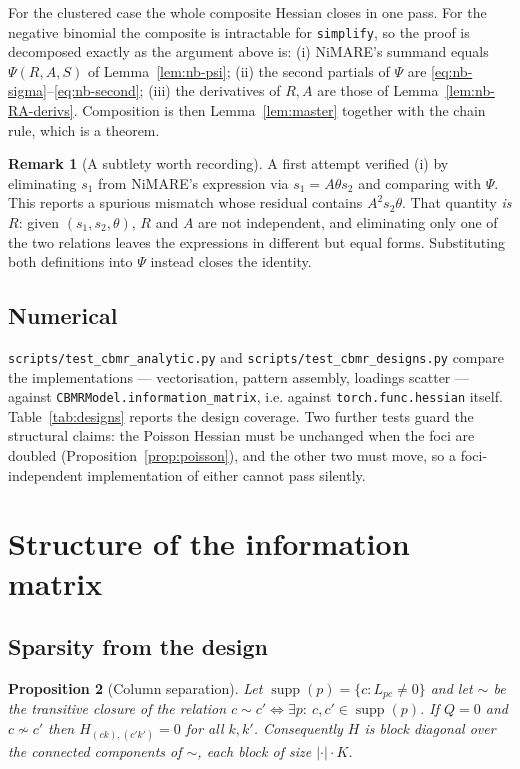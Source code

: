 \documentclass[11pt,a4paper]{article}
\theoremstyle{plain}
\newtheorem{proposition}{Proposition}
\theoremstyle{definition}
\newtheorem{remark}[proposition]{Remark}
\newcommand{\supp}{\operatorname{supp}}
\begin{document}
For the clustered case the whole composite Hessian closes in one pass. For the negative binomial
the composite is intractable for \texttt{simplify}, so the proof is decomposed exactly as the
argument above is: (i) NiMARE's summand equals $\Psi(R,A,S)$ of Lemma~\ref{lem:nb-psi}; (ii) the
second partials of $\Psi$ are \eqref{eq:nb-sigma}--\eqref{eq:nb-second}; (iii) the derivatives of
$R,A$ are those of Lemma~\ref{lem:nb-RA-derivs}. Composition is then
Lemma~\ref{lem:master} together with the chain rule, which is a theorem.

\begin{remark}[A subtlety worth recording]
A first attempt verified (i) by eliminating $s_1$ from NiMARE's expression via $s_1 = A\theta s_2$
and comparing with $\Psi$. This reports a spurious mismatch whose residual contains
$A^2 s_2 \theta$. That quantity \emph{is} $R$: given $(s_1,s_2,\theta)$, $R$ and $A$ are not
independent, and eliminating only one of the two relations leaves the expressions in different
but equal forms. Substituting both definitions into $\Psi$ instead closes the identity.
\end{remark}

\subsection{Numerical}

\texttt{scripts/test\_cbmr\_analytic.py} and \texttt{scripts/test\_cbmr\_designs.py} compare
the implementations --- vectorisation, pattern assembly, loadings scatter --- against
\texttt{CBMRModel.information\_matrix}, i.e. against \texttt{torch.func.hessian} itself.
Table~\ref{tab:designs} reports the design coverage. Two further tests guard the structural
claims: the Poisson Hessian must be unchanged when the foci are doubled
(Proposition~\ref{prop:poisson}), and the other two must move, so a foci-independent
implementation of either cannot pass silently.

\section{Structure of the information matrix}

\subsection{Sparsity from the design}

\begin{proposition}[Column separation]\label{prop:blocks}
Let $\supp(p) = \{c : L_{pc} \neq 0\}$ and let $\sim$ be the transitive closure of the relation
$c \sim c' \iff \exists p:\ c,c' \in \supp(p)$. If $Q = 0$ and $c \not\sim c'$ then
$H_{(ck),(c'k')} = 0$ for all $k,k'$. Consequently $H$ is block diagonal over the connected
components of $\sim$, each block of size $|{\cdot}| \cdot K$.
\end{proposition}
\end{document}
